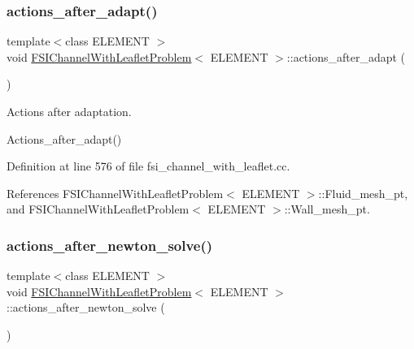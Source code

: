\subsubsection{\texorpdfstring{actions\+\_\+after\+\_\+adapt()}{actions\_after\_adapt()}}
{\footnotesize\ttfamily template$<$class E\+L\+E\+M\+E\+NT $>$ \\
void \hyperlink{classFSIChannelWithLeafletProblem}{F\+S\+I\+Channel\+With\+Leaflet\+Problem}$<$ E\+L\+E\+M\+E\+NT $>$\+::actions\+\_\+after\+\_\+adapt (\begin{DoxyParamCaption}{ }\end{DoxyParamCaption})}



Actions after adaptation. 

Actions\+\_\+after\+\_\+adapt() 

Definition at line 576 of file fsi\+\_\+channel\+\_\+with\+\_\+leaflet.\+cc.



References F\+S\+I\+Channel\+With\+Leaflet\+Problem$<$ E\+L\+E\+M\+E\+N\+T $>$\+::\+Fluid\+\_\+mesh\+\_\+pt, and F\+S\+I\+Channel\+With\+Leaflet\+Problem$<$ E\+L\+E\+M\+E\+N\+T $>$\+::\+Wall\+\_\+mesh\+\_\+pt.

\mbox{\label{classFSIChannelWithLeafletProblem_abff6e46a940263c9255a61f649bb4239}} 
\subsubsection{\texorpdfstring{actions\+\_\+after\+\_\+newton\+\_\+solve()}{actions\_after\_newton\_solve()}}
{\footnotesize\ttfamily template$<$class E\+L\+E\+M\+E\+NT $>$ \\
void \hyperlink{classFSIChannelWithLeafletProblem}{F\+S\+I\+Channel\+With\+Leaflet\+Problem}$<$ E\+L\+E\+M\+E\+NT $>$\+::actions\+\_\+after\+\_\+newton\+\_\+solve (\begin{DoxyParamCaption}{ }\end{DoxyParamCaption})\hspace{0.3cm}{\ttfamily [inline]}}



